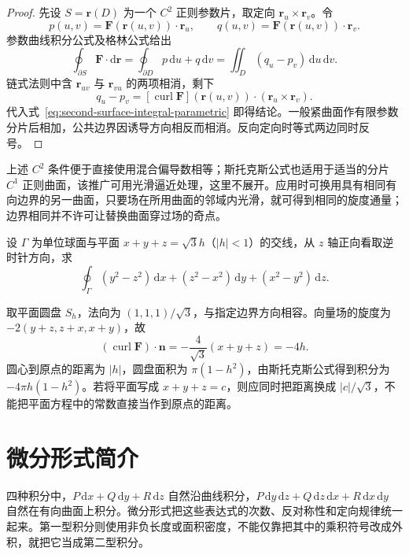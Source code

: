 \begin{proof}
先设 $S=\boldsymbol r(D)$ 为一个 $C^2$ 正则参数片，取定向 $\boldsymbol r_u\times\boldsymbol r_v$。令
\[
    p(u,v)=\boldsymbol F(\boldsymbol r(u,v))\cdot\boldsymbol r_u,
    \qquad q(u,v)=\boldsymbol F(\boldsymbol r(u,v))\cdot\boldsymbol r_v.
\]
参数曲线积分公式及格林公式给出
\[
    \oint_{\partial S}\boldsymbol F\cdot\mathrm d\boldsymbol r
    =\oint_{\partial D}p\,\mathrm du+q\,\mathrm dv
    =\iint_D(q_u-p_v)\,\mathrm du\,\mathrm dv.
\]
链式法则中含 $\boldsymbol r_{uv}$ 与 $\boldsymbol r_{vu}$ 的两项相消，剩下
\[
    q_u-p_v
    =[\operatorname{curl}\boldsymbol F](\boldsymbol r(u,v))
      \cdot(\boldsymbol r_u\times\boldsymbol r_v).
\]
代入式~\eqref{eq:second-surface-integral-parametric} 即得结论。一般紧曲面作有限参数分片后相加，公共边界因诱导方向相反而相消。反向定向时等式两边同时反号。
\end{proof}

上述 $C^2$ 条件便于直接使用混合偏导数相等；斯托克斯公式也适用于适当的分片 $C^1$ 正则曲面，该推广可用光滑逼近处理，这里不展开。应用时可换用具有相同有向边界的另一曲面，只要场在所用曲面的邻域内光滑，就可得到相同的旋度通量；边界相同并不许可让替换曲面穿过场的奇点。

\begin{example}
\label{ex:stokes-sphere-plane-circle}
设 $\Gamma$ 为单位球面与平面 $x+y+z=\sqrt3h$（$|h|<1$）的交线，从 $z$ 轴正向看取逆时针方向，求
\[
    \oint_\Gamma(y^2-z^2)\,\mathrm dx+(z^2-x^2)\,\mathrm dy+(x^2-y^2)\,\mathrm dz.
\]
\end{example}
\begin{solve}
取平面圆盘 $S_h$，法向为 $(1,1,1)/\sqrt3$，与指定边界方向相容。向量场的旋度为 $-2(y+z,z+x,x+y)$，故
\[
    (\operatorname{curl}\boldsymbol F)\cdot\boldsymbol n
    =-\frac4{\sqrt3}(x+y+z)=-4h.
\]
圆心到原点的距离为 $|h|$，圆盘面积为 $\pi(1-h^2)$，由斯托克斯公式得到积分为 $-4\pi h(1-h^2)$。若将平面写成 $x+y+z=c$，则应同时把距离换成 $|c|/\sqrt3$，不能把平面方程中的常数直接当作到原点的距离。
\end{solve}

\section{微分形式简介}
\label{sec:introduction-to-differential-forms}

四种积分中，$P\,\mathrm dx+Q\,\mathrm dy+R\,\mathrm dz$ 自然沿曲线积分，$P\,\mathrm dy\,\mathrm dz+Q\,\mathrm dz\,\mathrm dx+R\,\mathrm dx\,\mathrm dy$ 自然在有向曲面上积分。微分形式把这些表达式的次数、反对称性和定向规律统一起来。第一型积分则使用非负长度或面积密度，不能仅靠把其中的乘积符号改成外积，就把它当成第二型积分。

